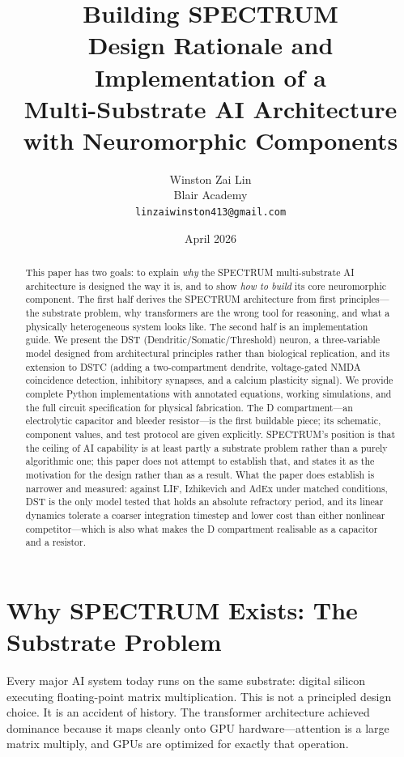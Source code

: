 \documentclass[12pt]{article}
\title{\textbf{Building SPECTRUM}\\
\large Design Rationale and Implementation of a\\
Multi-Substrate AI Architecture with Neuromorphic Components}
\author{
    Winston Zai Lin \\
    \small Blair Academy \\
    \small \texttt{linzaiwinston413@gmail.com}
}
\date{April 2026}
\begin{document}
\maketitle

\begin{abstract}
This paper has two goals: to explain \textit{why} the SPECTRUM multi-substrate AI architecture is designed the way it is, and to show \textit{how to build} its core neuromorphic component. The first half derives the SPECTRUM architecture from first principles---the substrate problem, why transformers are the wrong tool for reasoning, and what a physically heterogeneous system looks like. The second half is an implementation guide. We present the DST (Dendritic/Somatic/Threshold) neuron, a three-variable model designed from architectural principles rather than biological replication, and its extension to DSTC (adding a two-compartment dendrite, voltage-gated NMDA coincidence detection, inhibitory synapses, and a calcium plasticity signal). We provide complete Python implementations with annotated equations, working simulations, and the full circuit specification for physical fabrication. The D compartment---an electrolytic capacitor and bleeder resistor---is the first buildable piece; its schematic, component values, and test protocol are given explicitly. SPECTRUM's position is that the ceiling of AI capability is at least partly a substrate problem rather than a purely algorithmic one; this paper does not attempt to establish that, and states it as the motivation for the design rather than as a result. What the paper does establish is narrower and measured: against LIF, Izhikevich and AdEx under matched conditions, DST is the only model tested that holds an absolute refractory period, and its linear dynamics tolerate a coarser integration timestep and lower cost than either nonlinear competitor---which is also what makes the D compartment realisable as a capacitor and a resistor.
\end{abstract}

\section{Why SPECTRUM Exists: The Substrate Problem}
\label{sec:why}

Every major AI system today runs on the same substrate: digital silicon executing floating-point matrix multiplication. This is not a principled design choice. It is an accident of history. The transformer architecture \cite{vaswani2017} achieved dominance because it maps cleanly onto GPU hardware---attention is a large matrix multiply, and GPUs are optimized for exactly that operation.
\end{document}
